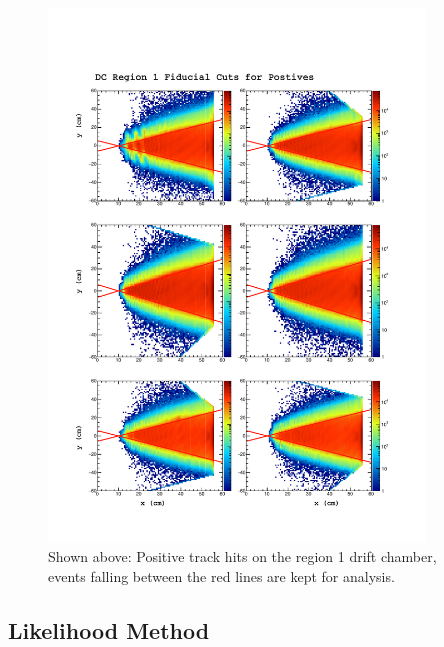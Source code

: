 \begin{figure}
  \label{fig:fid}
  \begin{center}
    \includegraphics[width=10cm]{image/fid.pdf}
    \caption{Shown above: Positive track hits on the region 1 drift chamber, events falling between the red lines are kept for analysis.}
  \end{center}
\end{figure}

%
%

\subsection{Likelihood Method}

